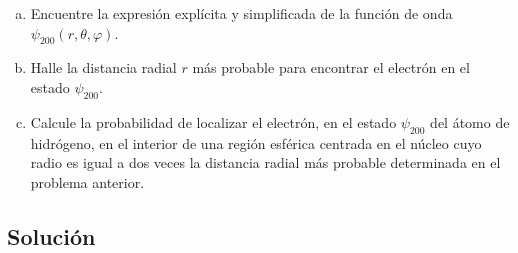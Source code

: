 \documentclass[a4paper]{article}
\begin{document}
\begin{enumerate}[a)]
    \item Encuentre la expresión explícita y simplificada de la función de onda $\psi_{200}(r,\theta,\varphi)$.
    \item Halle la distancia radial $r$ más probable para encontrar el electrón en el estado $\psi_{200}$.
    \item Calcule la probabilidad de localizar el electrón, en el estado $\psi_{200}$ del átomo de hidrógeno, en el interior de una región esférica centrada en el núcleo cuyo radio es igual a dos veces la distancia radial más probable determinada en el problema anterior.
\end{enumerate}

\subsection{Solución}
\end{document}
